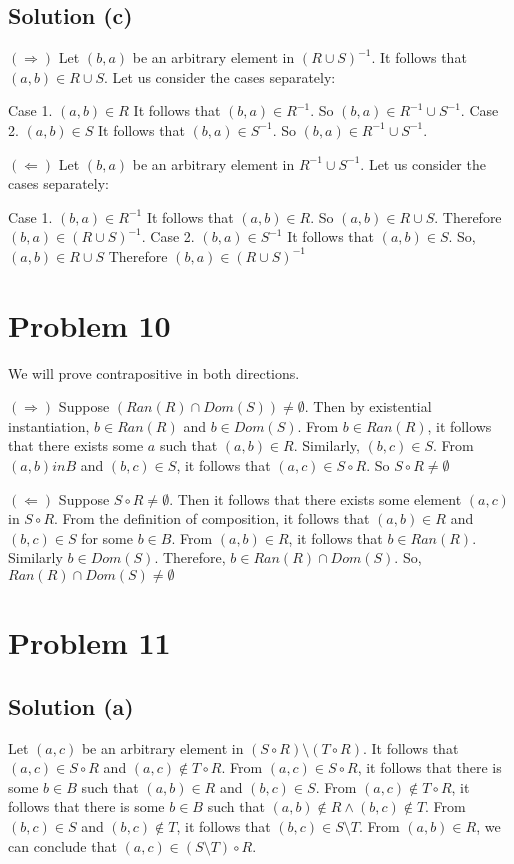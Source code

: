 \documentclass{article}
\begin{document}
\subsection{Solution (c)}

$(\Rightarrow)$ Let $(b,a)$ be an arbitrary element in $(R \cup
S)^{-1}$. It follows that $(a,b) \in R \cup S$. Let us consider the
cases separately:

Case 1. $(a,b) \in R$ It follows that $(b,a) \in R^{-1}$. So $(b,a)
\in R^{-1} \cup S^{-1}$.
Case 2. $(a,b) \in S$ It follows that $(b,a) \in S^{-1}$. So $(b,a)
\in R^{-1} \cup S^{-1}$.

$(\Leftarrow)$ Let $(b,a)$ be an arbitrary element in $R^{-1} \cup
S^{-1}$. Let us consider the cases separately:

Case 1. $(b,a) \in R^{-1}$ It follows that $(a,b) \in R$. So $(a,b)
\in R \cup S$. Therefore $(b,a) \in (R \cup S)^{-1}$.
Case 2. $(b,a) \in S^{-1}$ It follows that $(a,b) \in S$. So, $(a,b)
\in R \cup S$ Therefore $(b,a) \in (R \cup S)^{-1}$

\section{Problem 10}

We will prove contrapositive in both directions.

$(\Rightarrow)$ Suppose $(Ran(R) \cap Dom(S)) \neq \emptyset$. Then by
existential instantiation, $b \in Ran(R)$ and $b \in Dom(S)$. From $b
\in Ran(R)$, it follows that there exists some $a$ such that $(a,b)
\in R$. Similarly, $(b,c) \in S$. From $(a,b)in B$ and $(b,c) \in S$,
it follows that $(a,c) \in S \circ R$. So $S \circ R \neq \emptyset$ 

$(\Leftarrow)$ Suppose $S \circ R \neq \emptyset$. Then it follows
that there exists some element $(a,c)$ in $S \circ R$. From the
definition of composition, it follows that $(a,b) \in R$ and $(b,c)
\in S$ for some $b \in B$. From $(a,b) \in R$, it follows that $b \in
Ran(R)$. Similarly $b \in Dom(S)$. Therefore, $b \in Ran(R) \cap
Dom(S)$. So, $Ran (R) \cap Dom(S) \neq \emptyset$

\section{Problem 11}
\subsection{Solution (a)}
Let $(a,c)$ be an arbitrary element in $(S \circ R) \setminus (T \circ
R)$. It follows that $(a,c) \in S \circ R$ and $(a,c) \notin T \circ
R$. From $(a,c) \in S \circ R$, it follows that there is some $b \in
B$ such that $(a,b) \in R$ and $(b,c) \in S$. From $(a,c) \notin T
\circ R$, it follows that there is some $b \in B$ such that $(a,b)
\notin R \land (b,c) \notin T$. From $(b,c) \in S$ and $(b,c) \notin
T$, it follows that $(b,c) \in S \setminus T$. From $(a,b) \in R$, we
can conclude that $(a,c) \in (S \setminus T) \circ R$.
\end{document}
